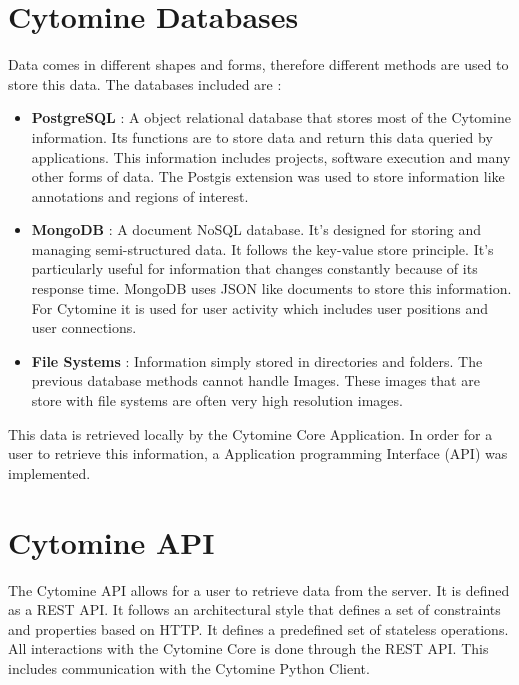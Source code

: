 \documentclass[a4paper,11pt]{report}
\numberwithin{figure}{section} %
\begin{document}
    \section{Cytomine Databases}
    Data comes in different shapes and forms, therefore different methods are used to store this data.
    The databases included are :
    \begin{itemize}
        \item[\textbullet] \textbf{PostgreSQL} : A object relational database that stores most of the Cytomine information.
        Its functions are to store data and return this data queried by applications.
        This information includes projects, software execution and many other forms of data.
        The Postgis extension was used to store information like annotations and regions of interest.
        \item[\textbullet] \textbf{MongoDB} : A document NoSQL database.
        It's designed for storing and managing semi-structured data.
        It follows the key-value store principle.
        It's particularly useful for information that changes constantly because of its response time.
        MongoDB uses JSON like documents to store this information.
        For Cytomine it is used for user activity which includes user positions and user connections.
        \item[\textbullet] \textbf{File Systems} : Information simply stored in directories and folders.
        The previous database methods cannot handle Images.
        These images that are store with file systems are often very high resolution images.
    \end{itemize}

    This data is retrieved locally by the Cytomine Core Application.
    In order for a user to retrieve this information, a Application programming Interface (API) was implemented.


    \section{Cytomine API}

    The Cytomine API allows for a user to retrieve data from the server.
    It is defined as a REST API.
    It follows an architectural style that defines a set of constraints and properties based on HTTP.
    It defines a predefined set of stateless operations.
    All interactions with the Cytomine Core is done through the REST API.
    This includes communication with the Cytomine Python Client.\\
\end{document}
